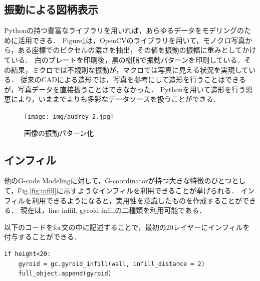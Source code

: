 \documentclass{article}
\begin{document}
\begin{twocolumn}
\subsection{振動による図柄表示}
Pythonの持つ豊富なライブラリを用いれば，あらゆるデータをモデリングのために活用できる．
Figure\ref{fig:audrey}は，OpenCVのライブラリを用いて，モノクロ写真から，ある座標でのピクセルの濃さを抽出，その値を振動の振幅に重みとしてかけている．
白のプレートを印刷後，黒の樹脂で振動パターンを印刷している．その結果，ミクロでは不規則な振動が，マクロでは写真に見える状況を実現している．
従来のCADによる造形では，写真を参考にして造形を行うことはできるが，写真データを直接扱うことはできなかった．
Pythonを用いて造形を行う恩恵により，いままでよりも多彩なデータソースを扱うことができる．
\begin{figure}[htbp]
  \texttt{[image: img/audrey\_2.jpg]}
  \caption{画像の振動パターン化}
  \label{fig:audrey}
\end{figure}

\subsection{インフィル}
他のG-code Modelingに対して，G-coordinatorが持つ大きな特徴のひとつとして，Fig.\ref{fig:infill}に示すようなインフィルを利用できることが挙げられる．
インフィルを利用できるようになると，実用性を意識したものを作成することができる．
現在は，line infiil, gyroid infillの二種類を利用可能である．

以下のコードをfor文の中に記述することで，最初の20レイヤーにインフィルを付与することができる．
\begin{lstlisting}
if height<20:
    gyroid = gc.gyroid_infill(wall, infill_distance = 2)
    full_object.append(gyroid)
\end{lstlisting}


\end{twocolumn}
\end{document}
